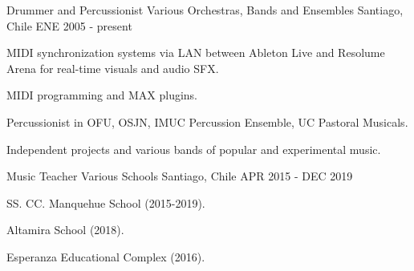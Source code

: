 \begin{cventries}
  \cventry
    {Drummer and Percussionist}
    {Various Orchestras, Bands and Ensembles}
    {Santiago, Chile}
    {ENE 2005 - present}
    {
    	\begin{cvitems} %
    	  \item {MIDI synchronization systems via LAN between Ableton Live and Resolume Arena for real-time visuals and audio SFX.}
    	  \item {MIDI programming and MAX plugins.}
        \item {Percussionist in OFU, OSJN, IMUC Percussion Ensemble, UC Pastoral Musicals.}
        \item {Independent projects and various bands of popular and experimental music.}
      \end{cvitems}
		}

  \cventry
    {Music Teacher} %
    {Various Schools} %
    {Santiago, Chile} %
    {APR 2015 - DEC 2019} %
    {
      \begin{cvitems} %
        \item {SS. CC. Manquehue School (2015-2019).}
        \item {Altamira School (2018).}
        \item {Esperanza Educational Complex (2016).}
      \end{cvitems}
    }

\end{cventries}


